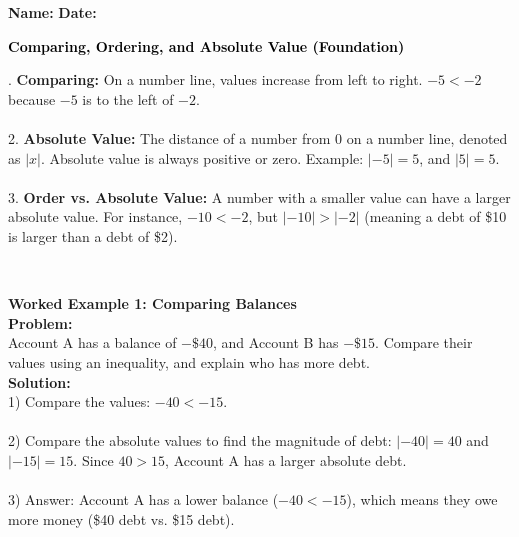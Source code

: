\documentclass[12pt, letterpaper, fleqn]{article}
\begin{document}
\textbf{Name:} \underline{\hspace{5cm}}
\hfill
\textbf{Date:} \underline{\hspace{3cm}}\\

\begin{tcolorbox}[colback=black!10]
    \large\textcolor{black}{\textbf{Comparing, Ordering, and Absolute Value (Foundation)}}
\end{tcolorbox}

\vspace{3mm}

. \textbf{Comparing:} On a number line, values increase from left to right. $-5 < -2$ because $-5$ is to the left of $-2$. \\ \vspace{0.5cm} \\
2. \textbf{Absolute Value:} The distance of a number from 0 on a number line, denoted as $|x|$. Absolute value is always positive or zero. Example: $|-5| = 5$, and $|5| = 5$. \\ \vspace{0.5cm} \\
3. \textbf{Order vs. Absolute Value:} A number with a smaller value can have a larger absolute value. For instance, $-10 < -2$, but $|-10| > |-2|$ (meaning a debt of \$10 is larger than a debt of \$2).

\vspace{0.5cm} \\

\vspace{4mm}

\begin{tcolorbox}[colback=white, colframe=black!25, boxrule=0.6pt, arc=4mm, left=6mm, right=6mm, top=5mm, bottom=5mm]
\textbf{Worked Example 1: Comparing Balances}
\vspace{0.3cm} \\
\medskip
\noindent
\textbf{Problem:} \\ Account A has a balance of $-\$40$, and Account B has $-\$15$. Compare their values using an inequality, and explain who has more debt.
\vspace{1cm} \\
\medskip
\noindent
\textbf{Solution:} \\
1) Compare the values: $-40 < -15$. \\ \vspace{1cm} \\
2) Compare the absolute values to find the magnitude of debt: $|-40| = 40$ and $|-15| = 15$. Since $40 > 15$, Account A has a larger absolute debt. \\ \vspace{1cm} \\
3) Answer: Account A has a lower balance ($-40 < -15$), which means they owe more money (\$40 debt vs. \$15 debt). \\
\end{tcolorbox}
\end{document}
